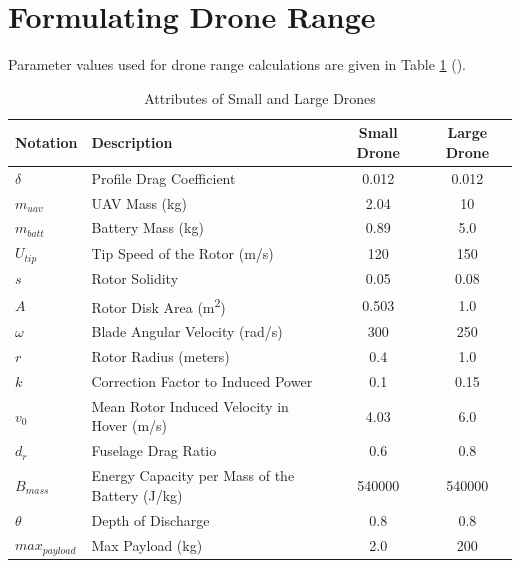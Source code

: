 \documentclass[preprint,review,11pt,authoryear]{elsarticle}
\begin{document}
\section{Formulating Drone Range} \label{app:drone_range}
Parameter values used for drone range calculations are given in Table \ref{tab:drone_attributes} (\cite{dukkanci2021minimizing}).
\begin{table}[h!]
    \centering
    \caption{Attributes of Small and Large Drones}
    \begin{tabular}{|l|l|c|c|}
    \hline
    \textbf{Notation} & \textbf{Description} & \textbf{Small Drone} & \textbf{Large Drone} \\ \hline
    \texttt{$\delta$}    & Profile Drag Coefficient                & 0.012                 & 0.012               \\ \hline
    \texttt{$m_{uav}$}   & UAV Mass (kg)                           & 2.04                  & 10                  \\ \hline
    \texttt{$m_{batt}$}  & Battery Mass (kg)                       & 0.89                  & 5.0                 \\ \hline
    \texttt{$U_{tip}$}   & Tip Speed of the Rotor (m/s)            & 120                   & 150                 \\ \hline
    \texttt{$s$}        & Rotor Solidity                           & 0.05                  & 0.08                \\ \hline
    \texttt{$A$}        & Rotor Disk Area (m\textsuperscript{2})   & 0.503                 & 1.0                 \\ \hline
    \texttt{$\omega$}    & Blade Angular Velocity (rad/s)          & 300                   & 250                 \\ \hline
    \texttt{$r$}        & Rotor Radius (meters)                    & 0.4                   & 1.0                 \\ \hline
    \texttt{$k$}        & Correction Factor to Induced Power       & 0.1                   & 0.15                \\ \hline
    \texttt{$v_0$}     & Mean Rotor Induced Velocity in Hover (m/s) & 4.03                & 6.0                 \\ \hline
    \texttt{$d_r$}     & Fuselage Drag Ratio                       & 0.6                   & 0.8                 \\ \hline
    \texttt{$B_{mass}$}  & Energy Capacity per Mass of the Battery (J/kg) & 540000           & 540000              \\ \hline
    \texttt{$\theta$}    & Depth of Discharge                      & 0.8                   & 0.8                 \\ \hline
    \texttt{$max_{payload}$} & Max Payload (kg)                    & 2.0                   & 200                 \\ \hline
    \end{tabular}
    \label{tab:drone_attributes}
    \end{table}
\end{document}
